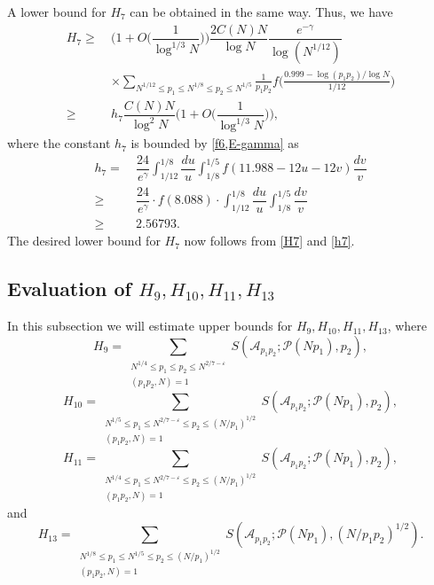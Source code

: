 \documentclass[12pt, a4paper]{amsart}
\def\leq{\leqslant}
\def\le{\leqslant}
\def\ge{\geqslant}
\theoremstyle{plain}
\theoremstyle{remark}
\numberwithin{equation}{section}
\begin{document}
A lower bound for $H_7$ can be obtained in the same way.
Thus, we have
\begin{equation}\label{H7}
\begin{aligned}
H_7
\ge\ & \bigg(1+O\bigg(\dfrac{1}{\log^{1/3}N}\bigg)\bigg)\dfrac{2C(N)N}{\log N}\dfrac{e^{-\gamma}}{\log (N^{1/12})}\\
&\times \sum_{N^{1/12} \leq p_1 \le N^{1/8} \le p_2 \le N^{1/5} } \frac{1}{p_1p_2}f\bigg(\frac{0.999-\log (p_1p_2)/\log N}{1/12}\bigg)\\
\ge\ &h_7\dfrac{C(N)N}{\log^2 N} \bigg(1+O\bigg(\dfrac{1}{\log^{1/3}N}\bigg)\bigg),
\end{aligned}
\end{equation}
where the constant $h_7$ is bounded by \eqref{f6,E-gamma} as 
\begin{equation}\label{h7}
\begin{aligned}
h_{7}=\ & \dfrac{24}{e^{\gamma}}\int_{1/12}^{1/8}\dfrac{du}{u}\int_{1/8}^{1/5}f(11.988-12u-12v)\dfrac{dv}{v}\\
\ge\ & \dfrac{24}{e^{\gamma}}\cdot f(8.088)\cdot \int_{1/12}^{1/8}\dfrac{du}{u}\int_{1/8}^{1/5}\dfrac{dv}{v}\\
\ge\ & 2.56793.
\end{aligned}
\end{equation}
The desired lower bound for $H_7$ now follows from \eqref{H7} and \eqref{h7}.

\subsection{Evaluation of $H_{9},H_{10},H_{11},H_{13}$}
In this subsection we will estimate upper bounds for $H_9,H_{10},H_{11},H_{13}$, where
\[
H_{9}  = \sum_{\substack{N^{1/4} \leq p_1 \le p_2 \le N^{2/7-\varepsilon} \\ (p_1 p_2, N) = 1}} S(\mathscr{A}_{p_1 p_2}; \mathscr{P}(N p_1), p_2),
\]
\[
H_{10} = \sum_{\substack{N^{1/5} \leq p_1 \le N^{2/7-\varepsilon}\le p_2 \le (N/p_1)^{1/2} \\ (p_1 p_2, N) = 1}} S(\mathscr{A}_{p_1 p_2}; \mathscr{P}(N p_1), p_2),
\]
\[
H_{11} = \sum_{\substack{N^{1/4} \leq p_1 \le N^{2/7-\varepsilon}\le p_2 \le (N/p_1)^{1/2} \\ (p_1 p_2, N) = 1}} S(\mathscr{A}_{p_1 p_2}; \mathscr{P}(N p_1), p_2),
\]
and 
\[
H_{13} = \sum_{\substack{N^{1/8} \leq p_1 \le N^{1/5} \leq p_2 \le (N/p_1)^{1/2} \\ (p_1 p_2, N) = 1}} S(\mathscr{A}_{p_1 p_2}; \mathscr{P}(N p_1), (N/p_1 p_2)^{1/2}).
\]
\end{document}
